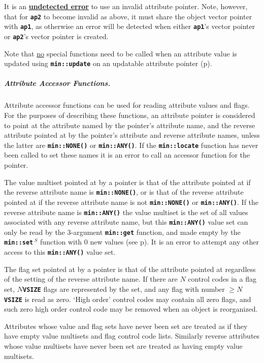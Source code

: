 \documentclass[12pt]{article}
\newcommand{\subsubsubsubsection}[1]{\subparagraph[#1]{#1.}}
\newcommand{\TT}[1]{{\tt \bfseries #1}}
\newcommand{\pagref}[1]{p\pageref{#1}}
\newcommand{\EOL}{\penalty \exhyphenpenalty}
\newcommand{\RESIZE}{$\,^S$}
\begin{document}
It is an \underline{\bf undetected error}
to use an invalid attribute pointer.  Note, however, that for \TT{ap2}
to become invalid as above, it must share the object vector pointer
with \TT{ap1}, as otherwise an error will be detected when either
\TT{ap1}'s vector pointer or \TT{ap2}'s vector pointer is created.

Note that \underline{no} special functions need to be called when an attribute
value is updated using \TT{min::\EOL update} on
an updatable attribute pointer (\pagref{UPDATABLE-ATTRIBUTE-FUNCTIONS}).

\subsubsubsubsection{Attribute Accessor Functions}
\label{ATTRIBUTE-ACCESSOR-FUNCTIONS}

Attribute accessor functions
can be used for reading attribute values and flags.
For the purposes of describing these functions,
an attribute pointer is considered to point at the attribute
named by the pointer's attribute name, and the reverse attribute
pointed at by the pointer's attribute and reverse attribute names,
unless the latter are \TT{min::NONE()} or \TT{min::ANY()}.
If the \TT{min::\EOL locate} function has never been called to set
these names it is an error to call an accessor
function for the pointer.

The value multiset pointed at by a pointer is that of the attribute pointed
at if the reverse attribute name is \TT{min::NONE()}, or is that of
the reverse attribute pointed at if the reverse attribute name is not
\TT{min::NONE()} or \TT{min::ANY()}.
If the reverse attribute name is \TT{min::ANY()}
\label{REVERSE-ATTRIBUTE-NAME-ANY} the value multiset is
the set of all values associated with any reverse attribute name, but
this \TT{min::ANY()}
value set can only be read by the 3-argument \TT{min::get}
function, and made empty by the \TT{min::\EOL set\RESIZE}
function with 0 new values (see \pagref{MIN::SET_DELETE_ANY}).
It is an error to attempt any other access to this \TT{min::ANY()} value set.

The flag set pointed at by a pointer is that of the attribute pointed
at regardless of the setting of the reverse attribute name.
If there are $N$ control codes in a flag set, $N$\TT{*VSIZE} flags are
represented by the set, and any flag with number $\geq N$\TT{*VSIZE} is
read as zero.  `High order' control codes may contain all zero flags,
and such zero high order control code may be removed when an object
is reorganized.

Attributes whose value and flag sets have never been set are treated
as if they have empty value multisets and flag control code lists.
Similarly reverse attributes
whose value multisets have never been set are treated as having empty value
multisets.
\end{document}
